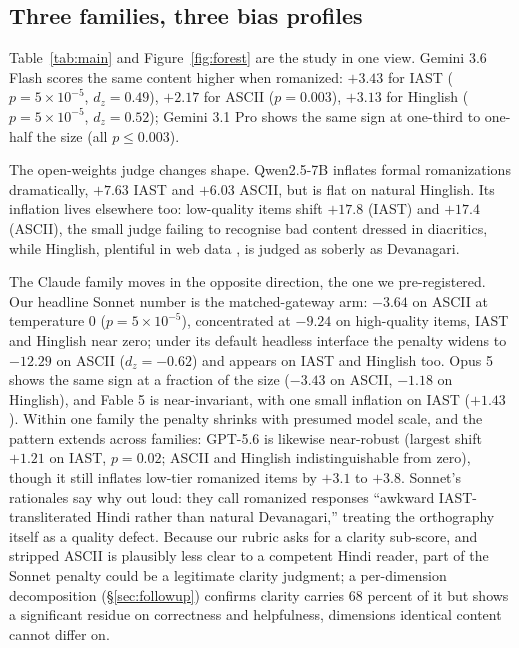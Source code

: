 \subsection{Three families, three bias profiles}

Table~\ref{tab:main} and Figure~\ref{fig:forest} are the study in one view. Gemini 3.6 Flash scores the same content higher when romanized: $+3.43$ for IAST ($p = 5 \times 10^{-5}$, $d_z = 0.49$), $+2.17$ for ASCII ($p = 0.003$), $+3.13$ for Hinglish ($p = 5 \times 10^{-5}$, $d_z = 0.52$); Gemini 3.1 Pro shows the same sign at one-third to one-half the size (all $p \le 0.003$).

The open-weights judge changes shape. Qwen2.5-7B inflates formal romanizations dramatically, $+7.63$ IAST and $+6.03$ ASCII, but is flat on natural Hinglish. Its inflation lives elsewhere too: low-quality items shift $+17.8$ (IAST) and $+17.4$ (ASCII), the small judge failing to recognise bad content dressed in diacritics, while Hinglish, plentiful in web data \citep{sheth2025comilingua}, is judged as soberly as Devanagari.

The Claude family moves in the opposite direction, the one we pre-registered. Our headline Sonnet number is the matched-gateway arm: $-3.64$ on ASCII at temperature 0 ($p = 5 \times 10^{-5}$), concentrated at $-9.24$ on high-quality items, IAST and Hinglish near zero; under its default headless interface the penalty widens to $-12.29$ on ASCII ($d_z = -0.62$) and appears on IAST and Hinglish too. Opus 5 shows the same sign at a fraction of the size ($-3.43$ on ASCII, $-1.18$ on Hinglish), and Fable 5 is near-invariant, with one small inflation on IAST ($+1.43$). Within one family the penalty shrinks with presumed model scale, and the pattern extends across families: GPT-5.6 is likewise near-robust (largest shift $+1.21$ on IAST, $p=0.02$; ASCII and Hinglish indistinguishable from zero), though it still inflates low-tier romanized items by $+3.1$ to $+3.8$. Sonnet's rationales say why out loud: they call romanized responses ``awkward IAST-transliterated Hindi rather than natural Devanagari,'' treating the orthography itself as a quality defect. Because our rubric asks for a clarity sub-score, and stripped ASCII is plausibly less clear to a competent Hindi reader, part of the Sonnet penalty could be a legitimate clarity judgment; a per-dimension decomposition (\S\ref{sec:followup}) confirms clarity carries 68 percent of it but shows a significant residue on correctness and helpfulness, dimensions identical content cannot differ on.

